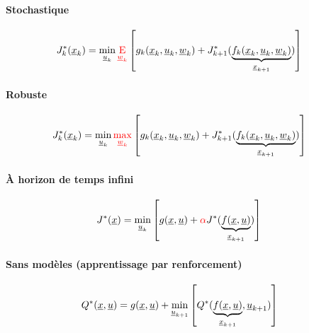 \paragraph{Stochastique}

\begin{align}
J^*_k(\col{x}_k) = 
\operatornamewithlimits{min}\limits_{\col{u}_k}
{\color{red}
\operatornamewithlimits{E}\limits_{\col{w}_k}
}
&\left[
g_k(\col{x}_k , \col{u}_k , \col{w}_k ) + J^*_{k+1}( 
\underbrace{
f_k(\col{x}_k , \col{u}_k , \col{w}_k ) 
}_{\col{x}_{k+1}}
)
\right] 
\end{align} 

\paragraph{Robuste}

\begin{align}
J^*_k(\col{x}_k) = 
\operatornamewithlimits{min}\limits_{\col{u}_k}
{\color{red}
\operatornamewithlimits{max}\limits_{\col{w}_k}
}
&\left[
g_k(\col{x}_k , \col{u}_k , \col{w}_k ) + J^*_{k+1}( 
\underbrace{
f_k(\col{x}_k , \col{u}_k , \col{w}_k ) 
}_{\col{x}_{k+1}}
)
\right] 
\end{align} 

\paragraph{À horizon de temps infini}

\begin{align}
J^*(\col{x}) = 
\operatornamewithlimits{min}\limits_{\col{u}_k}
&\left[
g(\col{x} , \col{u} ) + {\color{red}\alpha} J^*( 
\underbrace{
f(\col{x} , \col{u} ) 
}_{\col{x}_{k+1}}
)
\right] 
\end{align} 

\paragraph{Sans modèles (apprentissage par renforcement)}

\begin{align}
Q^*(\col{x}, \col{u} ) = g(\col{x} , \col{u} ) + 
\operatornamewithlimits{min}\limits_{\col{u}_{k+1}}
&\left[
Q^*( 
\underbrace{
f(\col{x} , \col{u} ) 
}_{\col{x}_{k+1}}
, \col{u}_{k+1}
)
\right] 
\end{align} 

